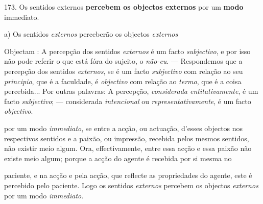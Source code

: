 173. Os sentidos externos \textbf{percebem os objectos externos} por um \textbf{modo} immediato.

a) Os sentidos \emph{externos} perceberão os objectos \emph{externos}

Objectam : A percepção dos sentidos \emph{externos} é um facto \emph{subjectivo}, e por isso não pode referir o que está fóra do sujeito, o \emph{não-eu}. --- Respondemos que a percepção dos sentidos \emph{externos}, se é um facto \emph{subjectivo} com relação ao seu \emph{principio}, que é a faculdade, é \emph{objectivo} com relação ao \emph{termo}, que é a coisa percebida... Por outras palavras: A percepção, \emph{considerada entitativamente}, é um facto \emph{subjectivo}; --- considerada \emph{intencional} ou \emph{representativamente}, é um facto \emph{objectivo}.

por um modo \emph{immediato}, se entre a acção, ou actuação, d'esses objectos nos respectivos sentidos e a paixão, ou impressão, recebida pelos mesmos sentidos, não existir meio algum. Ora, effectivamente, entre essa acção e essa paixão não existe meio algum; porque a acção do agente é recebida por si mesma no

paciente, e na acção e pela acção, que reflecte as propriedades do agente, este é percebido pelo paciente. Logo os sentidos \emph{externos} percebem os objectos \emph{externos} por um modo \emph{immediato}.

